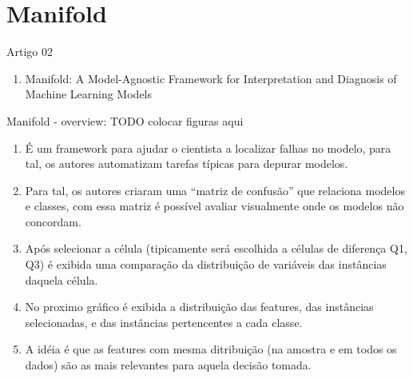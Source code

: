 \section{Manifold}

\begin{frame}
	\begin{block}{Artigo 02}
	\begin{enumerate}
		\item Manifold: A Model-Agnostic Framework for Interpretation and Diagnosis of Machine Learning Models
	\end{enumerate}
	\end{block}
\end{frame}


\begin{frame}
	\begin{block}{Manifold - overview: TODO colocar figuras aqui}
		\begin{enumerate}
			\item É um framework para ajudar o cientista a localizar falhas no modelo, para tal, os autores automatizam tarefas típicas para depurar modelos.
			\item Para tal, os autores criaram uma ``matriz de confusão'' que relaciona modelos e classes, com essa matriz é possível avaliar visualmente onde os modelos não concordam.
			\item Após selecionar a célula (tipicamente será escolhida a células de diferença Q1, Q3) é exibida uma comparação da distribuição de variáveis das instâncias daquela célula.
			\item No proximo gráfico é exibida a distribuição das features, das instâncias selecionadas, e das instâncias pertencentes a cada classe.
			\item A idéia é que as features com mesma ditribuição (na amostra e em todos os dados) são as mais relevantes para aquela decisão tomada.
		\end{enumerate}
	\end{block}
\end{frame}

